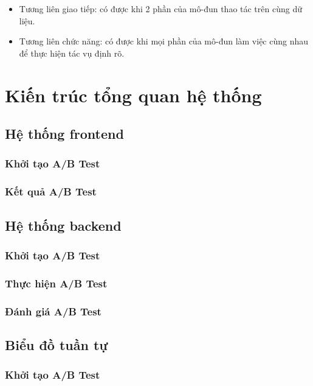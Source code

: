 \begin{itemize}
	\item Tương liên giao tiếp: có được khi 2 phần của mô-đun thao tác trên cùng dữ liệu.
	\item Tương liên chức năng: có được khi mọi phần của mô-đun làm việc cùng nhau để thực hiện tác vụ định rõ.
\end{itemize}

\section{Kiến trúc tổng quan hệ thống}

\subsection{Hệ thống frontend}

\subsubsection{Khởi tạo A/B Test}

\subsubsection{Kết quả A/B Test}

\subsection{Hệ thống backend}

\subsubsection{Khởi tạo A/B Test}

\subsubsection{Thực hiện A/B Test}

\subsubsection{Đánh giá A/B Test}

\subsection{Biểu đồ tuần tự}

\subsubsection{Khởi tạo A/B Test}

